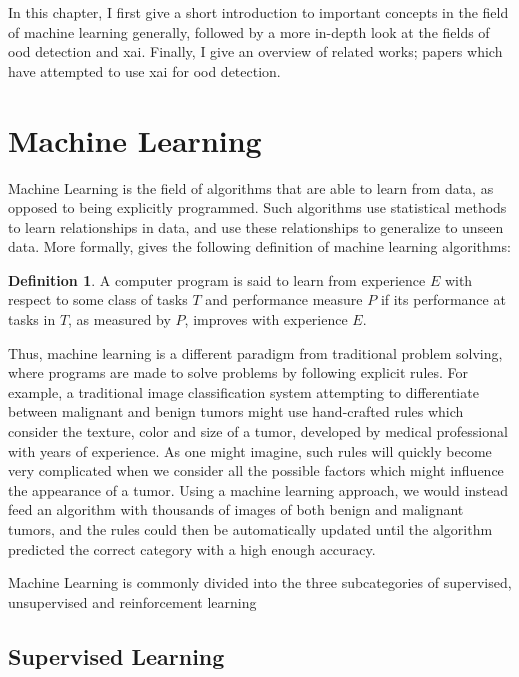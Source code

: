 \documentclass[UKenglish]{uiomasterthesis} %
\theoremstyle{definition}
\newtheorem*{definition}{Definition}
\begin{document}
In this chapter, I first give a short introduction to important concepts in the field of machine learning generally, followed by a more in-depth look at the fields of \ac{ood} detection and \ac{xai}. Finally, I give an overview of related works; papers which have attempted to use \ac{xai} for \ac{ood} detection.

\section{Machine Learning}

Machine Learning is the field of algorithms that are able to learn from data, as opposed to being explicitly programmed. Such algorithms use statistical methods to learn relationships in data, and use these relationships to generalize to unseen data. More formally, \cite{mitchell} gives the following definition of machine learning algorithms:

\begin{definition}
A computer program is said to learn from experience $E$ with respect to some class of tasks $T$ and performance measure $P$ if its performance at tasks in $T$, as measured by $P$, improves with experience $E$.
\end{definition}

Thus, machine learning is a different paradigm from traditional problem solving, where programs are made to solve problems by following explicit rules. For example, a traditional image classification system attempting to differentiate between malignant and benign tumors might use hand-crafted rules which consider the texture, color and size of a tumor, developed by medical professional with years of experience. As one might imagine, such rules will quickly become very complicated when we consider all the possible factors which might influence the appearance of a tumor. Using a machine learning approach, we would instead feed an algorithm with thousands of images of both benign and malignant tumors, and the rules could then be automatically updated until the algorithm predicted the correct category with a high enough accuracy.

Machine Learning is commonly divided into the three subcategories of supervised, unsupervised and reinforcement learning

\subsection{Supervised Learning}
\end{document}
